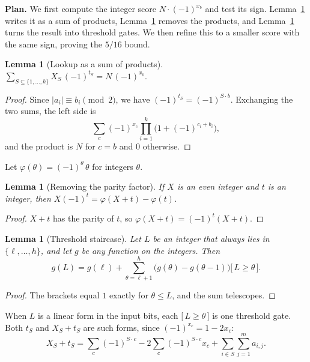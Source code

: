 \documentclass[11pt,letterpaper]{article}
\newtheorem{lemma}[theorem]{Lemma}
\theoremstyle{remark}
\newcommand{\ind}[1]{\bigl[\,#1\,\bigr]}
\newcommand{\smalltitle}[1]{\textbf{\color{ink}#1}\quad}
\begin{document}
\smalltitle{Plan.}
We first compute the integer score $N\cdot(-1)^{x_b}$ and test its sign.
Lemma~\ref{lem:lookup} writes it as a sum of products,
Lemma~\ref{lem:parity} removes the products, and Lemma~\ref{lem:ladder}
turns the result into threshold gates. We then refine this to a smaller score
with the same sign, proving the $5/16$ bound.

\begin{lemma}[Lookup as a sum of products]\label{lem:lookup}
$\displaystyle\sum_{S\subseteq\{1,\dots,k\}}X_S\,(-1)^{t_S}=N\,(-1)^{x_b}.$
\end{lemma}
\begin{proof}
Since $|a_i|\equiv b_i\pmod2$, we have $(-1)^{t_S}=(-1)^{S\cdot b}$.
Exchanging the two sums, the left side is
\[
\sum_c(-1)^{x_c}\prod_{i=1}^k\bigl(1+(-1)^{c_i+b_i}\bigr),
\]
and the product is $N$ for $c=b$ and $0$ otherwise.
\end{proof}

Let $\varphi(\theta)=(-1)^\theta\,\theta$ for integers $\theta$.

\begin{lemma}[Removing the parity factor]\label{lem:parity}
If $X$ is an even integer and $t$ is an integer, then
$X(-1)^t=\varphi(X+t)-\varphi(t)$.
\end{lemma}
\begin{proof}
$X+t$ has the parity of $t$, so $\varphi(X+t)=(-1)^t(X+t)$.
\end{proof}

\begin{lemma}[Threshold staircase]\label{lem:ladder}
Let $L$ be an integer that always lies in $\{\ell,\dots,h\}$, and let $g$
be any function on the integers. Then
\[
g(L)=g(\ell)+\sum_{\theta=\ell+1}^{h}\bigl(g(\theta)-g(\theta-1)\bigr)\ind{L\ge\theta}.
\]
\end{lemma}
\begin{proof}
The brackets equal $1$ exactly for $\theta\le L$, and the sum telescopes.
\end{proof}

When $L$ is a linear form in the input bits, each $\ind{L\ge\theta}$ is one
threshold gate. Both $t_S$ and $X_S+t_S$ are such forms, since
$(-1)^{x_c}=1-2x_c$:
\begin{equation}\label{eq:form}
X_S+t_S=\sum_c(-1)^{S\cdot c}-2\sum_c(-1)^{S\cdot c}x_c+\sum_{i\in S}\sum_{j=1}^m a_{i,j}.
\end{equation}
\end{document}
